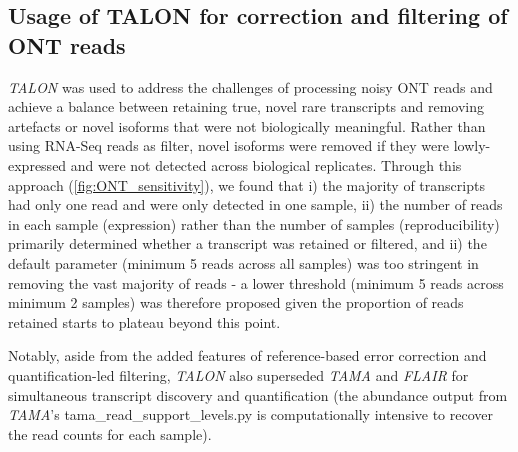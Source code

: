 \subsection{Usage of TALON for correction and filtering of ONT reads}
\textit{TALON} was used to address the challenges of processing noisy ONT reads and achieve a balance between retaining true, novel rare transcripts and removing artefacts or novel isoforms that were not biologically meaningful. Rather than using RNA-Seq reads as filter, novel isoforms were removed if they were lowly-expressed and were not detected across biological replicates. Through this approach (\cref{fig:ONT_sensitivity}), we found that i) the majority of transcripts had only one read and were only detected in one sample, ii) the number of reads in each sample (expression) rather than the number of samples (reproducibility) primarily determined whether a transcript was retained or filtered, and ii) the default parameter (minimum 5 reads across all samples) was too stringent in removing the vast majority of reads - a lower threshold (minimum 5 reads across minimum 2 samples) was therefore proposed given the proportion of reads retained starts to plateau beyond this point.  

Notably, aside from the added features of reference-based error correction and quantification-led filtering, \textit{TALON} also superseded \textit{TAMA} and \textit{FLAIR} for simultaneous transcript discovery and quantification (the abundance output from \textit{TAMA}'s tama\_read\_support\_levels.py is computationally intensive to recover the read counts for each sample). 
\resumetocwriting